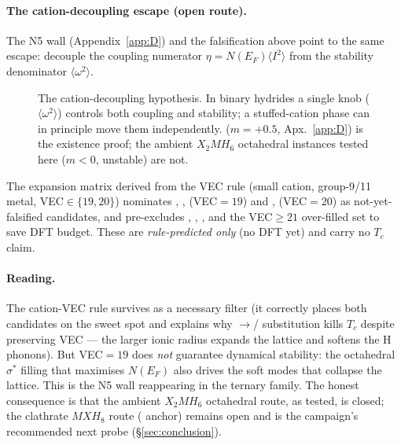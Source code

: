 \paragraph{The cation-decoupling escape (open route).}
The N5 wall (Appendix~\ref{app:D}) and the falsification above point to the
same escape: decouple the coupling numerator $\eta = N(E_F)\langle
I^2\rangle$ from the stability denominator $\langle\omega^2\rangle$.

\begin{figure}[h]
\centering
{}
\caption{The cation-decoupling hypothesis. In binary hydrides a single knob
($\langle\omega^2\rangle$) controls both coupling and stability; a
stuffed-cation phase can in principle move them independently. 
($m=+0.5$, Apx.~\ref{app:D}) is the existence proof; the ambient
$X_2MH_6$ octahedral instances tested here ($m<0$, unstable) are not.}
\label{fig:decouple}
\end{figure}

\noindent The expansion matrix derived from the VEC rule (small cation,
group-9/11 metal, VEC$\in\{19,20\}$) nominates , ,
 (VEC$=19$) and ,  (VEC$=20$) as
not-yet-falsified candidates, and pre-excludes , ,
, and the VEC$\ge21$ over-filled set to save DFT budget. These
are \emph{rule-predicted only} (no DFT yet) and carry no $T_c$ claim.

\paragraph{Reading.}
The cation-VEC rule survives as a necessary filter (it correctly places both
candidates on the sweet spot and explains why $\to$/
substitution kills $T_c$ despite preserving VEC --- the larger ionic radius
expands the lattice and softens the H phonons). But VEC$=19$ does \emph{not}
guarantee dynamical stability: the octahedral $\sigma^\ast$ filling that
maximises $N(E_F)$ also drives the soft modes that collapse the lattice. This
is the N5 wall reappearing in the ternary family. The honest consequence is
that the ambient $X_2MH_6$ octahedral route, as tested, is closed; the
clathrate $MXH_8$ route ( anchor) remains open and is the
campaign's recommended next probe (\S\ref{sec:conclusion}).
